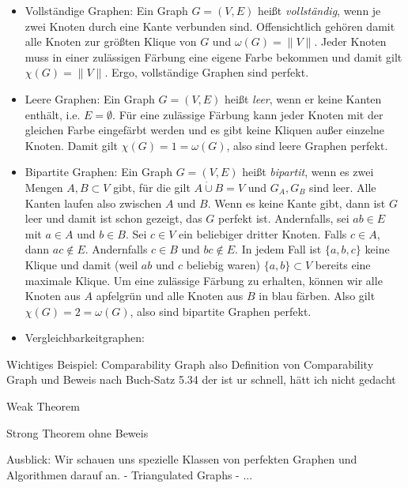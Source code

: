 \documentclass[../main.tex]{subfiles}
\begin{document}
\begin{itemize}
    \item Vollständige Graphen: Ein Graph $G = (V, E)$ heißt \emph{vollständig}, wenn je zwei Knoten durch eine Kante verbunden sind. Offensichtlich gehören damit alle Knoten zur größten Klique von $G$ und $\omega(G) = \|V\|$. Jeder Knoten muss in einer zulässigen Färbung eine eigene Farbe bekommen und damit gilt $\chi(G) = \|V\|$. Ergo, vollständige Graphen sind perfekt.
    \item Leere Graphen: Ein Graph $G = (V, E)$ heißt \emph{leer}, wenn er keine Kanten enthält, i.e. $E = \emptyset$. Für eine zulässige Färbung kann jeder Knoten mit der gleichen Farbe eingefärbt werden und es gibt keine Kliquen außer einzelne Knoten. Damit gilt $\chi(G) = 1 = \omega(G)$, also sind leere Graphen perfekt.
    \item Bipartite Graphen: Ein Graph $G = (V, E)$ heißt \emph{bipartit}, wenn es zwei Mengen $A, B \subset V$ gibt, für die gilt $A \dot\cup B = V$ und $G_A, G_B$ sind leer. Alle Kanten laufen also zwischen $A$ und $B$. Wenn es keine Kante gibt, dann ist $G$ leer und damit ist schon gezeigt, das $G$ perfekt ist. Andernfalls, sei $ab \in E$ mit $a \in A$ und $b \in B$. Sei $c \in V$ ein beliebiger dritter Knoten. Falls $c \in A$, dann $ac \notin E$. Andernfalls $c \in B$ und $bc \notin E$. In jedem Fall ist $\{a, b, c\}$ keine Klique und damit (weil $ab$ und $c$ beliebig waren) $\{a, b\} \subset V$ bereits eine maximale Klique. Um eine zulässige Färbung zu erhalten, können wir alle Knoten aus $A$ apfelgrün und alle Knoten aus $B$ in blau färben. Also gilt $\chi(G) = 2 = \omega(G)$, also sind bipartite Graphen perfekt.
    \item Vergleichbarkeitgraphen:
\end{itemize}

Wichtiges Beispiel: Comparability Graph
    also Definition von Comparability Graph
    und Beweis nach Buch-Satz 5.34
    der ist ur schnell, hätt ich nicht gedacht 

Weak Theorem

Strong Theorem ohne Beweis


Ausblick:
    Wir schauen uns spezielle Klassen von perfekten Graphen und Algorithmen darauf an.
        - Triangulated Graphs
        - ...
\end{document}
